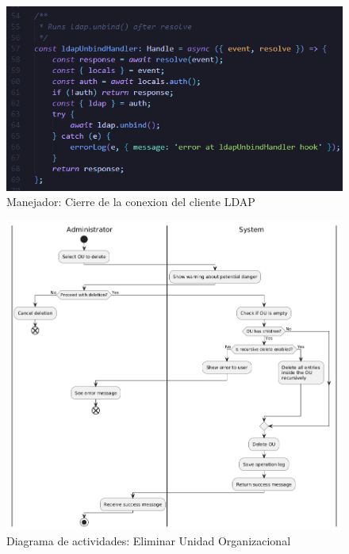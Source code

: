 \begin{figure}[H]
    \centering
    \includegraphics[width=\textwidth]{images/code/ldapUnbindHandler.png}
    \caption{Manejador: Cierre de la conexion del cliente LDAP}
    \label{fig:ldap-unbind-handler}
\end{figure}


\begin{figure}[H]
    \centering
    \includegraphics[width=\linewidth]{images/puml/activity-diagram delete ou/activity-diagram delete ou.png}
    \caption{Diagrama de actividades: Eliminar Unidad Organizacional}
    \label{fig:activity-diagram-delete-ou}
\end{figure}
\restoregeometry

